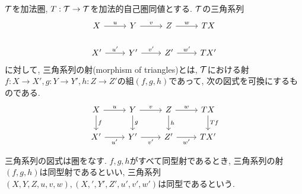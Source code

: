 \documentclass[uplatex, a4paper, 14Q, dvipdfmx]{jsarticle}
\begin{document}
\begin{definition}[三角系列の射]
  $\mathcal{T}$を加法圏, $T: \mathcal{T} \to \mathcal{T}$を加法的自己圏同値とする. 
  $\mathcal{T}$の三角系列
  \[\begin{tikzcd}
    X & Y & Z & TX \\
    {X'} & {Y'} & {Z'} & {TX'}
    \arrow["u", from=1-1, to=1-2]
    \arrow["v", from=1-2, to=1-3]
    \arrow["w", from=1-3, to=1-4]
    \arrow["{u'}", from=2-1, to=2-2]
    \arrow["{v'}", from=2-2, to=2-3]
    \arrow["{w'}", from=2-3, to=2-4]
  \end{tikzcd}\]
  に対して, 三角系列の射(morphism of triangles)とは, $\mathcal{T}$における射$f: X \to X', g: Y \to Y', h: Z \to Z'$の組$(f,g,h)$であって, 次の図式を可換にするものである. 
  \[\begin{tikzcd}
    X & Y & Z & TX \\
    {X'} & {Y'} & {Z'} & {TX'}
    \arrow["u", from=1-1, to=1-2]
    \arrow["v", from=1-2, to=1-3]
    \arrow["w", from=1-3, to=1-4]
    \arrow["f", from=1-1, to=2-1]
    \arrow["g", from=1-2, to=2-2]
    \arrow["h", from=1-3, to=2-3]
    \arrow["Tf", from=1-4, to=2-4]
    \arrow["{u'}"', from=2-1, to=2-2]
    \arrow["{v'}"', from=2-2, to=2-3]
    \arrow["{w'}"', from=2-3, to=2-4]
  \end{tikzcd}\]
\end{definition}

三角系列の図式は圏をなす. 
$f,g,h$がすべて同型射であるとき, 三角系列の射$(f,g,h)$は同型射であるといい, 三角系列$(X,Y,Z,u,v,w), (X,',Y',Z',u',v',w')$は同型であるという. 
\end{document}
